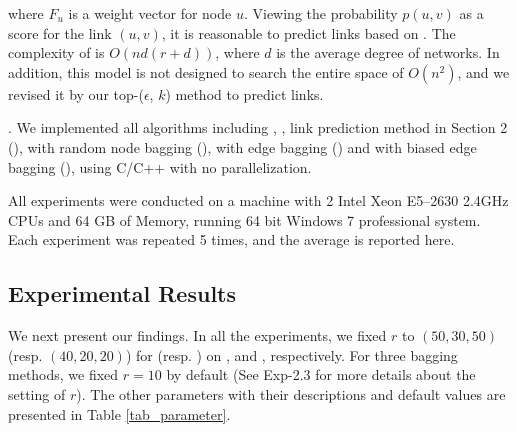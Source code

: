 \noindent  where $F_u$ is a weight vector for node $u$. Viewing the probability $p(u, v)$ as
  a score for the link $(u, v)$, it is reasonable to predict links based on \BIGCLAM.
The complexity of  \BIGCLAM is $O(nd(r + d) )$, where $d$ is the average degree of networks.
  In addition, this model is not designed to search the entire space of $O( n^2 )$,
  and we revised it by our top-($\epsilon$, $k$) method to predict links.


.
We implemented all algorithms including \Aa, \BIGCLAM, link prediction method in Section 2 (\NMF),
\NMF with random node bagging (\Node), \NMF with  edge bagging (\Edge) and
\NMF with biased edge bagging (\Biased),  using C/C++ with no parallelization.


All experiments were conducted on a machine with 2 Intel Xeon
E5--2630 2.4GHz CPUs and 64 GB of Memory, running 64 bit
Windows 7 professional system. Each experiment was repeated 5 times,
and the average is reported here.



\subsection{Experimental Results}


We next present our findings. In all the experiments, we fixed $r$ to
$(50, 30, 50)$ (resp. $(40, 20, 20)$) for \NMF (resp. \BIGCLAM) on
\YouTube, \Flickr and \Wikipedia, respectively. For three bagging
methods, we fixed $r = 10$ by default (See Exp-2.3 for more details
about the setting of $r$). The other parameters with their
descriptions and default values are presented in Table \ref{tab_parameter}.

